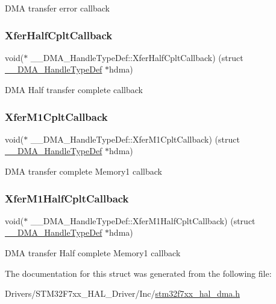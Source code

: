D\+MA transfer error callback \mbox{\label{struct_____d_m_a___handle_type_def_a2e343c6a9135222a8efb8ca5bb5dad8c}} 
\subsubsection{\texorpdfstring{XferHalfCpltCallback}{XferHalfCpltCallback}}
{\footnotesize\ttfamily void($\ast$  \+\_\+\+\_\+\+D\+M\+A\+\_\+\+Handle\+Type\+Def\+::\+Xfer\+Half\+Cplt\+Callback) (struct \mbox{\hyperlink{struct_____d_m_a___handle_type_def}{\+\_\+\+\_\+\+D\+M\+A\+\_\+\+Handle\+Type\+Def}} $\ast$hdma)}

D\+MA Half transfer complete callback \mbox{\label{struct_____d_m_a___handle_type_def_a5968053a3674b44460c1aa150499e01d}} 
\subsubsection{\texorpdfstring{XferM1CpltCallback}{XferM1CpltCallback}}
{\footnotesize\ttfamily void($\ast$  \+\_\+\+\_\+\+D\+M\+A\+\_\+\+Handle\+Type\+Def\+::\+Xfer\+M1\+Cplt\+Callback) (struct \mbox{\hyperlink{struct_____d_m_a___handle_type_def}{\+\_\+\+\_\+\+D\+M\+A\+\_\+\+Handle\+Type\+Def}} $\ast$hdma)}

D\+MA transfer complete Memory1 callback \mbox{\label{struct_____d_m_a___handle_type_def_aea9b02c5206e1b12380e0b83b5281e0d}} 
\subsubsection{\texorpdfstring{XferM1HalfCpltCallback}{XferM1HalfCpltCallback}}
{\footnotesize\ttfamily void($\ast$  \+\_\+\+\_\+\+D\+M\+A\+\_\+\+Handle\+Type\+Def\+::\+Xfer\+M1\+Half\+Cplt\+Callback) (struct \mbox{\hyperlink{struct_____d_m_a___handle_type_def}{\+\_\+\+\_\+\+D\+M\+A\+\_\+\+Handle\+Type\+Def}} $\ast$hdma)}

D\+MA transfer Half complete Memory1 callback 

The documentation for this struct was generated from the following file\+:\begin{DoxyCompactItemize}
\item 
Drivers/\+S\+T\+M32\+F7xx\+\_\+\+H\+A\+L\+\_\+\+Driver/\+Inc/\mbox{\hyperlink{stm32f7xx__hal__dma_8h}{stm32f7xx\+\_\+hal\+\_\+dma.\+h}}\end{DoxyCompactItemize}
